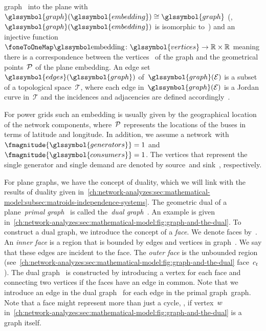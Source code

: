 graph~ into the plane
with~$\glssymbol{graph}(\glssymbol{embedding})\cong\glssymbol{graph}$ (\ie,
$\glssymbol{graph}(\glssymbol{embedding})$ is isomorphic to~)
and an injective
function~$\embeddingMap\colon\glssymbol{vertices}\to\reals\times\reals$ meaning
there is a correspondence between the vertices~ of the graph
and the geometrical points~$\mathcal{P}$ of the plane embedding. An edge
set~$\glssymbol{edges}(\glssymbol{graph})$ of~$\glssymbol{graph}(\embedding)$ is
a subset of a topological space~$\mathcal{T}$, where each edge
in~$\glssymbol{graph}(\embedding)$ is a Jordan curve in~$\mathcal{T}$ and the
incidences and adjacencies are defined accordingly~\parencite{Gro01}.

For power grids such an embedding is usually given by the geographical location
of the network components, where~$\mathcal{P}$ represents the locations of the buses
in terms of latitude and longitude. In addition, we assume a
network~\dcnetworktuple with~$\fmagnitude{\glssymbol{generators}} = 1$
and~$\fmagnitude{\glssymbol{consumers}} = 1$. The vertices that represent the
single generator and single demand are denoted by source~\source and sink~\sink,
respectively.

For plane graphs, we have the concept of duality, which we will link with the
results of duality given
in~\cref{ch:network-analyzes:sec:mathematical-model:subsec:matroids-independence-systems}.
The geometric dual of a plane~\emph{primal graph}~ is called
the~\emph{dual graph}~. An example is given
in~\cref{ch:network-analyzes:sec:mathematical-model:fig:graph-and-the-dual}. To
construct a dual graph, we introduce the concept of a \emph{face}. We denote
faces by~\face. An \emph{inner face} is a region that is bounded by edges and
vertices in graph~. We say that these edges are incident to the
face.
% 
The \emph{outer face} is the unbounded region
(see~\cref{ch:network-analyzes:sec:mathematical-model:fig:graph-and-the-dual}
face~$c_t$). The dual graph~ is constructed by
introducing a vertex for each face and connecting two vertices if the faces have
an edge in common. Note that we introduce an edge in the dual
graph~ for each edge in the primal graph~\gls{graph}.
% 
% 
Note that a face might represent more than just a cycle, \eg, if
vertex~$w$
in~\cref{ch:network-analyzes:sec:mathematical-model:fig:graph-and-the-dual} is a
graph itself.
%
